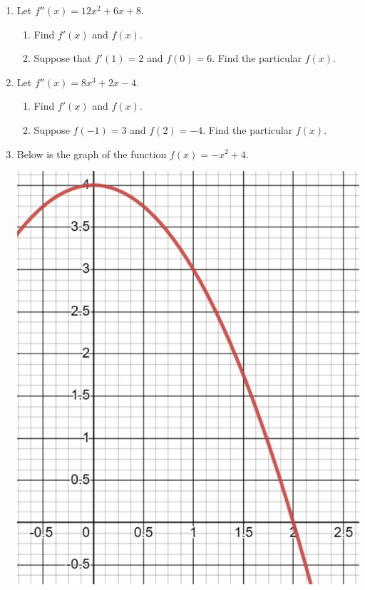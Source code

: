 \documentclass[12pt]{article}
\begin{document}
\begin{enumerate}
    \item Let $f''(x) = 12x^2 + 6x + 8$.
    \begin{enumerate}
        \item Find $f'(x)$ and $f(x)$.
        \vspace{2in}
        \item Suppose that $f'(1) = 2$ and $f(0) = 6$. Find the particular $f(x)$.
    \end{enumerate}
    \pagebreak
    \item Let $f''(x) = 8x^3 + 2x - 4$.
    \begin{enumerate}
        \item Find $f'(x)$ and $f(x)$.
        \vspace{2in}
        \item Suppose $f(-1) = 3$ and $f(2) = -4$. Find the particular $f(x)$.
    \end{enumerate}

    \pagebreak

    \item Below is the graph of the function $f(x) = -x^2+4$.
    \begin{center}
        \includegraphics[scale=0.4]{Images/S23 M215 PMT3 pic1.jpeg}
    \end{center}


\end{enumerate}
\end{document}
